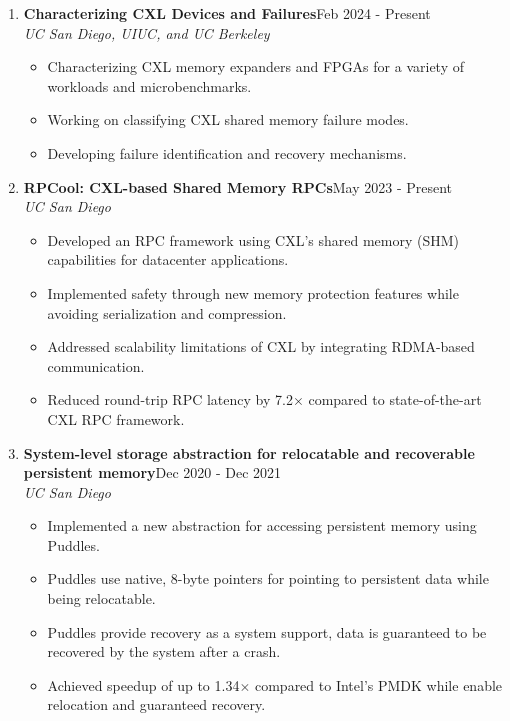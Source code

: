 \documentclass{article}
\newlength{\projitemsep}
\begin{document}
\begin{enumerate}
        \item \textbf{Characterizing CXL Devices and Failures}\hfill{}Feb 2024 - Present\\
    \textit{UC San Diego, UIUC, and UC Berkeley}\vspace{-0.15cm}
    \begin{itemize}[itemsep=\projitemsep]
            \item Characterizing CXL memory expanders and FPGAs for a variety of workloads and microbenchmarks.
            \item Working on classifying CXL shared memory failure modes.
            \item Developing failure identification and recovery mechanisms.
    \end{itemize}
        \item \textbf{RPCool: CXL-based Shared Memory RPCs}\hfill{}May 2023 - Present\\
    \textit{UC San Diego}\vspace{-0.15cm}
    \begin{itemize}[itemsep=\projitemsep]
            \item Developed an RPC framework using CXL's shared memory (SHM) capabilities for datacenter applications.
            \item Implemented safety through new memory protection features while avoiding serialization and compression.
            \item Addressed scalability limitations of CXL by integrating RDMA-based communication. 
            \item Reduced round-trip RPC latency by 7.2$\times$ compared to state-of-the-art CXL RPC framework.
      \end{itemize}
    \item \textbf{System-level storage abstraction for relocatable and recoverable persistent memory}\hfill{}Dec 2020 - Dec 2021\\
      \textit{UC San Diego}\vspace{-0.15cm}
    \begin{itemize}[itemsep=\projitemsep]
            \item Implemented a new abstraction for accessing persistent memory using Puddles.
            \item Puddles use native, 8-byte pointers for pointing to persistent data while being relocatable.
            \item Puddles provide recovery as a system support, data is guaranteed to be recovered by the system after a crash.
            \item Achieved speedup of up to 1.34$\times$ compared to Intel's PMDK while enable relocation and guaranteed recovery.
    \end{itemize}


\end{enumerate}
\end{document}
